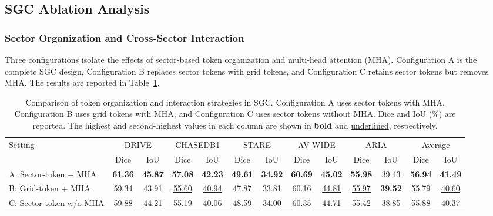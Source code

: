 \documentclass[a4paper,fleqn]{cas-sc}
\renewcommand{\arraystretch}{1.08}
\begin{document}
\subsection{SGC Ablation Analysis}

\subsubsection{Sector Organization and Cross-Sector Interaction}

Three configurations isolate the effects of sector-based token organization and multi-head attention (MHA).
Configuration A is the complete SGC design, Configuration B replaces sector tokens with grid tokens, and Configuration C retains sector tokens but removes MHA.
The results are reported in Table~\ref{tab:sgc_attention_comparison}.

\begin{table}[pos=!htbp]
\centering
\caption{Comparison of token organization and interaction strategies in SGC. Configuration A uses sector tokens with MHA, Configuration B uses grid tokens with MHA, and Configuration C uses sector tokens without MHA. Dice and IoU (\%) are reported. The highest and second-highest values in each column are shown in \textbf{bold} and \underline{underlined}, respectively.}
\label{tab:sgc_attention_comparison}
\scriptsize
\setlength{\tabcolsep}{4pt}
\renewcommand{\arraystretch}{1.08}

\begin{adjustbox}{max width=\textwidth,center}
\begin{tabular}{lcccccccccccc}
\toprule
\multirow{2}{*}{Setting}
& \multicolumn{2}{c}{DRIVE}
& \multicolumn{2}{c}{CHASEDB1}
& \multicolumn{2}{c}{STARE}
& \multicolumn{2}{c}{AV-WIDE}
& \multicolumn{2}{c}{ARIA}
& \multicolumn{2}{c}{Average} \\
\cmidrule(lr){2-3}
\cmidrule(lr){4-5}
\cmidrule(lr){6-7}
\cmidrule(lr){8-9}
\cmidrule(lr){10-11}
\cmidrule(lr){12-13}
& Dice & IoU & Dice & IoU & Dice & IoU & Dice & IoU & Dice & IoU & Dice & IoU \\
\midrule
A: Sector-token + MHA
& \textbf{61.36} & \textbf{45.87}
& \textbf{57.08} & \textbf{42.23}
& \textbf{49.61} & \textbf{34.92}
& \textbf{60.69} & \textbf{45.02}
& \textbf{55.98} & \underline{39.43}
& \textbf{56.94} & \textbf{41.49} \\

B: Grid-token + MHA
& 59.34 & 43.91
& \underline{55.60} & \underline{40.94}
& 47.87 & 33.81
& 60.16 & \underline{44.81}
& \underline{55.97} & \textbf{39.52}
& 55.79 & \underline{40.60} \\

C: Sector-token w/o MHA
& \underline{59.88} & \underline{44.21}
& 55.19 & 40.06
& \underline{48.59} & \underline{34.00}
& \underline{60.35} & 44.71
& 55.42 & 38.85
& \underline{55.88} & 40.37 \\
\bottomrule
\end{tabular}
\end{adjustbox}
\end{table}
\end{document}
